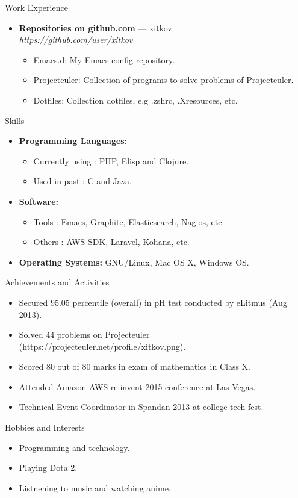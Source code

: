 \documentclass[a4paper,11pt,oneside]{article}
\newenvironment{ressection}[1]{
  \vspace{4pt}
         {\fontfamily{phv}\selectfont\Large#1}
         \begin{itemize}
           \vspace{3pt}
}{
         \end{itemize}
}
\newcommand{\resitem}[1]{
  \vspace{-4pt}
\item \begin{flushleft} #1 \end{flushleft}
}
\newcommand{\ressubitem}[1]{
  \vspace{-1pt}
\item \begin{flushleft} #1 \end{flushleft}
}
\newcommand{\resbigitem}[3]{
  \vspace{-5pt}
\item
  \textbf{#1} --- #2 \\
  \textit{#3}
}
\newenvironment{ressubsec}[3]{
  \resbigitem{#1}{#2}{#3}
  \vspace{-2pt}
  \begin{itemize}
}{
  \end{itemize}
}
\newenvironment{reslist}[1]{
  \resitem{\textbf{#1}}
  \vspace{-5pt}
  \begin{itemize}
}{
  \end{itemize}
}
\begin{document}
\begin{ressection}{Work Experience}
  \begin{ressubsec}{Repositories on github.com}{xitkov}{https://github.com/user/xitkov}
    \ressubitem{Emacs.d: My Emacs config repository.}
    \ressubitem{Projecteuler: Collection of programs to solve problems of Projecteuler.}
    \ressubitem{Dotfiles: Collection dotfiles, e.g .zshrc, .Xresources, etc.}
  \end{ressubsec}
\end{ressection}


\begin{ressection}{Skills}
  \begin{reslist}{Programming Languages:}
    \ressubitem{Currently using : PHP, Elisp and Clojure.}
    \ressubitem{Used in past : C and Java.}
  \end{reslist}
  \begin{reslist}{Software:}
    \ressubitem{Tools : Emacs, Graphite, Elasticsearch, Nagios, etc.}
    \ressubitem{Others : AWS SDK, Laravel, Kohana, etc.}
  \end{reslist}
    \resitem{\textbf{Operating Systems:} GNU/Linux, Mac OS X, Windows OS.}
\end{ressection}


\begin{ressection}{Achievements and Activities}
  \resitem{Secured 95.05 percentile (overall) in pH test conducted by eLitmus (Aug 2013).}
  \resitem{Solved 44 problems on Projecteuler (https://projecteuler.net/profile/xitkov.png).}
  \resitem{Scored 80 out of 80 marks in exam of mathematics in Class X.}
  \resitem{Attended Amazon AWS re:invent 2015 conference at Las Vegas.}
  \resitem{Technical Event Coordinator in Spandan 2013 at college tech fest.}
\end{ressection}


\begin{ressection}{Hobbies and Interests}
  \resitem{Programming and technology.}
  \resitem{Playing Dota 2.}
  \resitem{Listnening to music and watching anime.}
\end{ressection}
\end{document}
